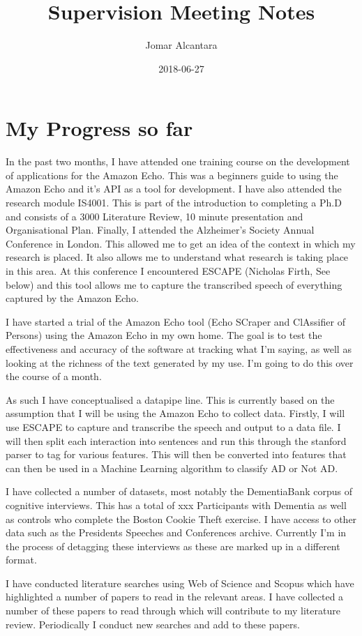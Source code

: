 \documentclass[a4paper]{article}
\title{Supervision Meeting Notes}
\date{2018-06-27}
\author{Jomar Alcantara}
\begin{document}
\maketitle
\section{My Progress so far}
In the past two months, I have attended one training course on the development of applications for the Amazon Echo. This was a beginners guide to using the Amazon Echo and it's API as a tool for development. I have also attended the research module IS4001. This is part of the introduction to completing a Ph.D and consists of a 3000 Literature Review, 10 minute presentation and Organisational Plan. Finally, I attended the Alzheimer's Society Annual Conference in London. This allowed me to get an idea of the context in which my research is placed. It also allows me to understand what research is taking place in this area. At this conference I encountered ESCAPE (Nicholas Firth, See below) and this tool allows me to capture the transcribed speech of everything captured by the Amazon Echo. \newline
\par 
I have started a trial of the Amazon Echo tool (Echo SCraper and ClAssifier of Persons) using the Amazon Echo in my own home. The goal is to test the effectiveness and accuracy of the software at tracking what I'm saying, as well as looking at the richness of the text generated by my use. I'm going to do this over the course of a month. \newline
\par 
As such I have conceptualised a datapipe line. This is currently based on the assumption that I will be using the Amazon Echo to collect data. Firstly, I will use ESCAPE to capture and transcribe the speech and output to a data file. I will then split each interaction into sentences and run this through the stanford parser to tag for various features. This will then be converted into features that can then be used in a Machine Learning algorithm to classify AD or Not AD. \newline
\par
I have collected a number of datasets, most notably the DementiaBank corpus of cognitive interviews. This has a total of xxx Participants with Dementia as well as controls who complete the Boston Cookie Theft exercise. I have access to other data such as the Presidents Speeches and Conferences archive. Currently I'm in the process of detagging these interviews as these are marked up in a different format. \newline
\par
I have conducted literature searches using Web of Science and Scopus which have highlighted a number of papers to read in the relevant areas. I have collected a number of these papers to read through which will contribute to my literature review. Periodically I conduct new searches and add to these papers. 
\end{document}
